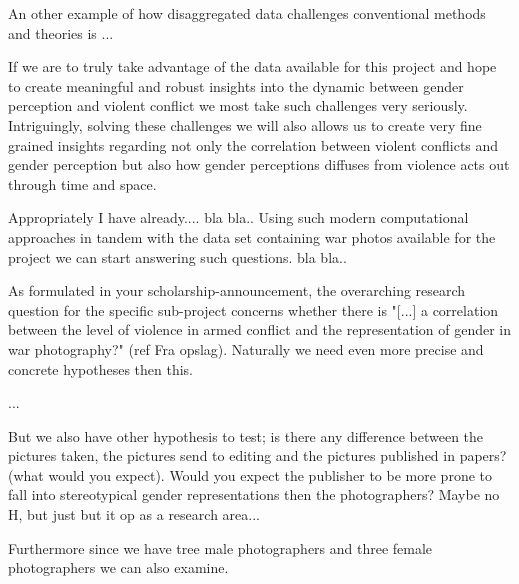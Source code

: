 \documentclass[a4paper]{article}
\begin{document}
An other example of how disaggregated data challenges conventional methods and theories is ... \par

If we are to truly take advantage of the data available for this project and hope to create meaningful and robust insights into the dynamic between gender perception and violent conflict we most take such challenges very seriously. Intriguingly, solving these challenges we will also allows us to create very fine grained insights regarding not only the correlation between violent conflicts and gender perception but also how gender perceptions diffuses from violence acts out through time and space.\par



Appropriately I have already.... bla bla.. Using such modern computational approaches in tandem with the data set containing war photos available for the project we can start answering such questions. bla bla.. \par

As formulated in your scholarship-announcement, the overarching research question for the specific sub-project concerns whether there is "[...] a correlation between the level of violence in armed conflict and the representation of gender in war photography?" (ref Fra opslag). Naturally we need even more precise and concrete hypotheses then this.\par %


... \par

But we also have other hypothesis to test; is there any difference between the pictures taken, the pictures send to editing and the pictures published in papers? (what would you expect). Would you expect the publisher to be more prone to fall into stereotypical gender representations then the photographers? Maybe no H, but just but it op as a research area...

Furthermore since we have tree male photographers and three female photographers we can also examine. 
\end{document}
